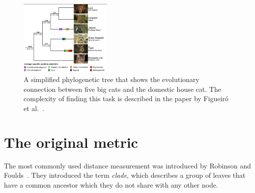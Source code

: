 \begin{figure}
	\centering
	\includegraphics[width=0.4\textwidth]{figures/cats_evolution.png}
	\caption{A simplified phylogenetic tree that shows the evolutionary connection between five big cats and the domestic house cat. The complexity of finding this task is described in the paper by Figueiró et al.~\cite{Fig}.}
\end{figure}

\section{The original metric}
The most commonly used distance measurement was introduced by Robinson and Foulds~\cite{Rob}. They introduced the term \textit{clade}, which describes a group of leaves that have a common ancestor which they do not share with any other node.

